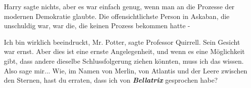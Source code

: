 Harry sagte nichts, aber es war einfach genug, wenn man an die Prozesse der
modernen Demokratie glaubte. Die offensichtlichste Person in Askaban, die
unschuldig war, war die, die keinen Prozess bekommen hatte -

\glqq{}Ich bin wirklich beeindruckt, Mr. Potter\grqq{}, sagte Professor Quirrell.
Sein Gesicht war ernst. \glqq{}Aber dies ist eine ernste Angelegenheit, und wenn
es eine Möglichkeit gibt, dass andere dieselbe Schlussfolgerung ziehen könnten,
muss ich das wissen. Also sage mir... Wie, im Namen von Merlin, von Atlantis und
der Leere zwischen den Sternen, hast du erraten, dass ich von
\textbf{\emph{Bellatrix}} gesprochen habe?\grqq{}

